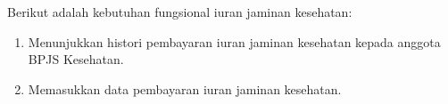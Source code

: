 Berikut adalah kebutuhan fungsional iuran jaminan kesehatan:
\begin{enumerate}
	\item Menunjukkan histori pembayaran iuran jaminan kesehatan kepada anggota BPJS Kesehatan.
	\item Memasukkan data pembayaran iuran jaminan kesehatan.
\end{enumerate}